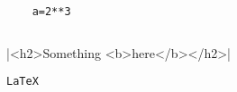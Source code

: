 \begin{verbatim}
	a=2**3
\end{verbatim}

\inputminted[bgcolor=bg]{python}{./ff.py}

|<h2>Something <b>here</b></h2>|

\texttt{\LaTeX}